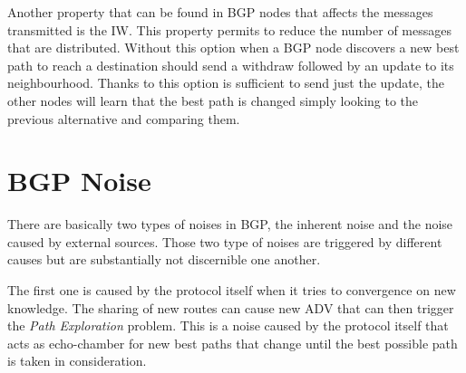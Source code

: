 Another property that can be found in \ac{BGP} nodes that affects the messages
transmitted is the \ac{IW}.
This property permits to reduce the number of messages that are distributed.
Without this option when a \ac{BGP} node discovers a new best path to reach
a destination should send a withdraw followed by an update to its neighbourhood.
Thanks to this option is sufficient to send just the update, the other nodes 
will learn that the best path is changed simply looking to the previous 
alternative and comparing them.


%

\section{BGP Noise}
\label{sec:bgp_noise}

There are basically two types of noises in \ac{BGP}, the inherent noise and the 
noise caused by external sources.
Those two type of noises are triggered by different causes but are substantially
not discernible one another.

The first one is caused by the protocol itself when it tries to convergence 
on new knowledge.
The sharing of new routes can cause new \ac{ADV} that can then trigger the
\textit{Path Exploration} problem.
This is a noise caused by the protocol itself that acts as echo-chamber for 
new best paths that change until the best possible path is taken in consideration.

